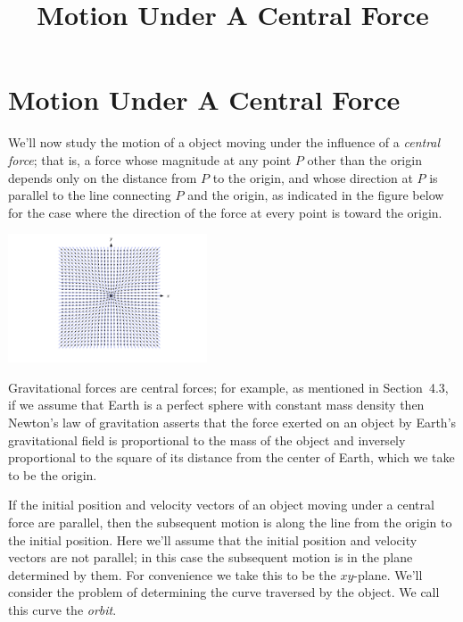\documentclass{ximera}
\title{Motion Under A Central Force}%
\begin{document}
\begin{abstract}

\end{abstract}

\maketitle

\section*{Motion Under A Central Force}

We'll now study the motion of a object moving under the influence
of a \textit{central force}; that is, a force whose magnitude at any
point $P$ other than the origin depends only on the distance from
$P$ to the origin, and whose direction at $P$ is parallel to the line
connecting $P$ and the origin, as indicated in
the figure below for the case where the direction of the force
at every point is toward the origin.

\begin{image}
 \includegraphics[height=1.5in]{fig060401.jpg}
 \end{image}

 Gravitational forces are central
forces;   for example, as mentioned in Section~4.3, if we
assume that Earth is a perfect sphere with constant mass density then
Newton's law of gravitation asserts that the force exerted on an
object by Earth's gravitational field is proportional to the mass of
the object and inversely proportional to the square of its distance
from the center of Earth, which we take to be the origin.

If the initial position and velocity vectors of an object moving under
a central force are parallel, then the subsequent motion is along the
line from the origin to the initial position. Here we'll assume that
the initial position and velocity vectors are not parallel;   in this
case the subsequent motion is in the plane determined by them. For
convenience we take this to be the $xy$-plane. We'll
consider
the problem of determining the curve traversed by the object. We call
this curve the \textit{orbit}.
\end{document}
